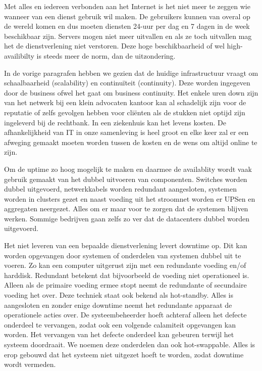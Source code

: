 Met alles en iedereen verbonden aan het Internet is het niet meer te zeggen wie wanneer van een dienst gebruik wil maken. De gebruikers kunnen van overal op de wereld komen en dus moeten diensten 24-uur per dag en 7 dagen in de week beschikbaar zijn. Servers mogen niet meer uitvallen en als ze toch uitvallen mag het de dienstverlening niet verstoren. Deze hoge beschikbaarheid of wel high-availibilty is steeds meer de norm, dan de uitzondering.

In de vorige paragrafen hebben we gezien dat de huidige infrastructuur vraagt om schaalbaarheid (scalability) en continu\"iteit (continuity). Deze worden ingegeven door de business ofwel het gaat om business continuity. Het enkele uren down zijn van het netwerk bij een klein advocaten kantoor kan al schadelijk zijn voor de reputatie of zelfs gevolgen hebben voor cli\"enten als de stukken niet optijd zijn ingeleverd bij de rechtbank. In een ziekenhuis kan het levens kosten. De afhankelijkheid van IT in onze samenleving is heel groot en elke keer zal er een afweging gemaakt moeten worden tussen de kosten en de wens om altijd online te zijn.

Om de uptime zo hoog mogelijk te maken en daarmee de availablity wordt vaak gebruik gemaakt van het dubbel uitvoeren van componenten. Switches worden dubbel uitgevoerd, netwerkkabels worden redundant aangesloten, systemen worden in clusters gezet en naast voeding uit het stroomnet worden er UPSen en aggregaten neergezet. Alles om er maar voor te zorgen dat de systemen blijven werken. Sommige bedrijven gaan zelfs zo ver dat de datacenters dubbel worden uitgevoerd.

Het niet leveren van een bepaalde dienstverlening levert downtime op. Dit kan worden opgevangen door systemen of onderdelen van systemen dubbel uit te voeren. Zo kan een computer uitgerust zijn met een redundante voeding en/of harddisk. Redundant betekent dat bijvoorbeeld de voeding niet operationeel is. Alleen als de primaire voeding ermee stopt neemt de redundante of secundaire voeding het over. Deze techniek staat ook bekend als hot-standby. Alles is aangesloten en zonder enige downtime neemt het redundante apparaat de operationele acties over. De systeembeheerder hoeft achteraf alleen het defecte onderdeel te vervangen, zodat ook een volgende calamiteit opgevangen kan worden. Het vervangen van het defecte onderdeel kan gebeuren terwijl het systeem doordraait. We noemen deze onderdelen dan ook hot-swappable. Alles is erop gebouwd dat het systeem niet uitgezet hoeft te worden, zodat downtime wordt vermeden.

